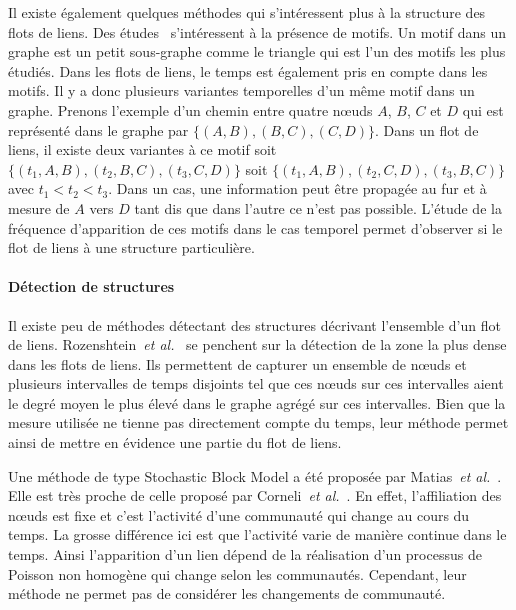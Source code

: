 Il existe également quelques méthodes qui s'intéressent plus à la structure des flots de liens.
Des études~\cite{Kovanen2011a,Kovanen2013a} s'intéressent à la présence de motifs.
Un motif dans un graphe est un petit sous-graphe comme le triangle qui est l'un des motifs les plus étudiés.
Dans les flots de liens, le temps est également pris en compte dans les motifs.
Il y a donc plusieurs variantes temporelles d'un même motif dans un graphe.
Prenons l'exemple d'un chemin entre quatre n\oe uds $A$, $B$, $C$ et $D$ qui est représenté dans le graphe par  $\{(A,B), (B,C), (C,D)\}$.
Dans un flot de liens, il existe deux variantes à ce motif soit
$\{(t_1,A,B), (t_2,B,C), (t_3,C,D)\}$ soit $\{(t_1,A,B), (t_2,C,D), (t_3,B,C)\}$ avec $t_1<t_2<t_3$.
Dans un cas,  une information peut être propagée au fur et à mesure de $A$ vers $D$ tant dis que dans l'autre ce n'est pas possible.
L'étude de la fréquence d'apparition de ces motifs dans le cas temporel permet d'observer si le flot de liens à une structure particulière. 



\paragraph{Détection de structures}
Il existe peu de méthodes détectant des structures décrivant l'ensemble d'un flot de liens.
Rozenshtein~\emph{et al.}~\cite{rozenshtein2014} se penchent sur la détection de la zone la plus dense dans les flots de liens.
Ils permettent de capturer un ensemble de n\oe uds et plusieurs intervalles de temps disjoints tel que ces n\oe uds sur ces intervalles aient le degré moyen le plus élevé dans le graphe agrégé sur ces intervalles.
Bien que la mesure utilisée ne tienne pas directement compte du temps, leur méthode permet ainsi de mettre en évidence une partie du flot de liens.

\cite{Viard2016,viard:hal-01208330}

Une méthode de type Stochastic Block Model a été proposée par Matias~\emph{et al.}~\cite{Matias2015a}.
Elle est très proche de celle proposé par Corneli~\emph{et al.}~\cite{Corneli2016}.
En effet, l'affiliation des n\oe uds est fixe et c'est l'activité d'une communauté qui change au cours du temps.
La grosse différence ici est que l'activité varie de manière continue dans le temps.
Ainsi l'apparition d'un lien dépend de la réalisation d'un processus de Poisson non homogène qui change selon les communautés.
Cependant, leur méthode ne permet pas de considérer les changements de communauté.

